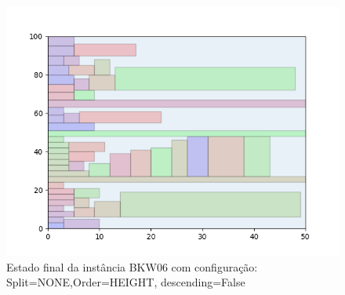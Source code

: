 \begin{figure}[H]
    \centering
    \caption[]{Estado final da instância BKW06 com configuração: Split=NONE,Order=HEIGHT, descending=False}
    \label{fig:bkw06-none-height-false}
    \includegraphics[scale=0.5]{output/figures/bkw/bkw06/none/height/false/00}
\end{figure}